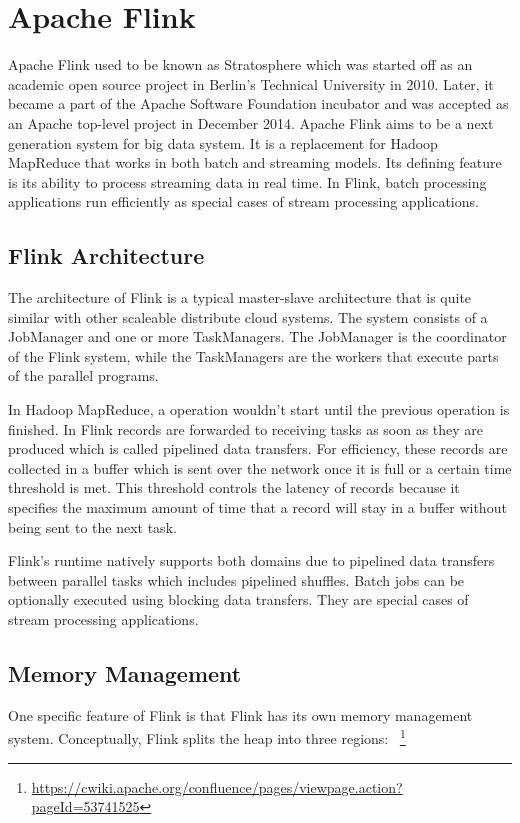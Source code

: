 \section{Apache Flink}
Apache Flink used to be known as Stratosphere which was started off as an academic open source project in Berlin's Technical University in 2010. Later, it became a part of the Apache Software Foundation incubator and was accepted as an Apache top-level project in December 2014. Apache Flink aims to be a next generation system for big data system. It is a replacement for Hadoop MapReduce that works in both batch and streaming models. Its defining feature is its ability to process streaming data in real time. In Flink, batch processing applications run efficiently as special cases of stream processing applications.

\subsection{Flink Architecture}
The architecture of Flink is a typical master-slave architecture that is quite similar with other scaleable distribute cloud systems. The system consists of a JobManager and one or more TaskManagers. The JobManager is the coordinator of the Flink system, while the TaskManagers are the workers that execute parts of the parallel programs. 

In Hadoop MapReduce, a operation wouldn't start until the previous operation is finished. In Flink records are forwarded to receiving tasks as soon as they are produced which is called pipelined data transfers. For efficiency, these records are collected in a buffer which is sent over the network once it is full or a certain time threshold is met. This threshold controls the latency of records because it specifies the maximum amount of time that a record will stay in a buffer without being sent to the next task. 

Flink's runtime natively supports both domains due to pipelined data transfers between parallel tasks which includes pipelined shuffles. Batch jobs can be optionally executed using blocking data transfers. They are special cases of stream processing applications.

\subsection{Memory Management}
One specific feature of Flink is that Flink has its own memory management system. Conceptually, Flink splits the heap into three regions: ~\footnote{\url{https://cwiki.apache.org/confluence/pages/viewpage.action?pageId=53741525}}

